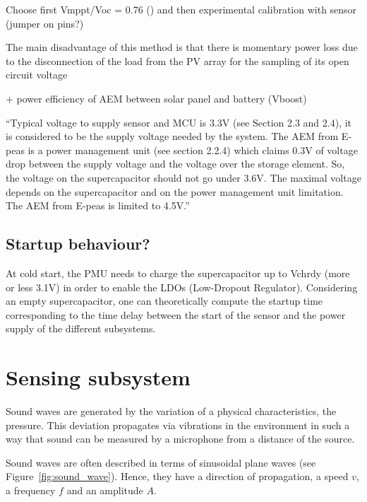 \documentclass{EPL-master-thesis-covers-EN}
\begin{document}
 Choose first Vmppt/Voc = 0.76 ()
 and then experimental calibration with sensor (jumper on pins?)
 
 The main disadvantage of this method is that there is
momentary power loss due to the disconnection of the load
from the PV array for the sampling of its open circuit voltage \cite{10.1109/ICSTE.2010.5608868}
 
+ power efficiency of AEM between solar panel and battery (Vboost)

``Typical voltage to supply sensor and MCU is 3.3V (see Section 2.3 and 2.4), it is considered to be
the supply voltage needed by the system. The AEM from E-peas is a power management unit
(see section 2.2.4) which claims 0.3V of voltage drop between the supply voltage and the voltage
over the storage element. So, the voltage on the supercapacitor should not go under 3.6V. The
maximal voltage depends on the supercapacitor and on the power management unit limitation.
The AEM from E-peas is limited to 4.5V.''






\section{Startup behaviour?}

At cold start, the PMU needs to charge the supercapacitor up to Vchrdy (more or less 3.1V) in order to enable the LDOs (Low-Dropout Regulator). Considering an empty supercapacitor, one can theoretically compute the startup time corresponding to the time delay between the start of the sensor and the power supply of the different subsystems.



\chapter{Sensing subsystem}

Sound waves are generated by the variation of a physical characteristics, the pressure. This deviation propagates via vibrations in the environment in such a way that sound can be measured by a microphone from a distance of the source.

Sound waves are often described in terms of sinusoidal plane waves (see Figure~\ref{fig:sound_wave}). Hence, they have a direction of propagation, a speed $v$, a frequency $f$ and an amplitude $A$. 
\end{document}
